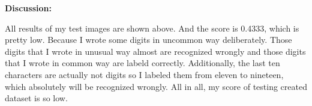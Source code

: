 \documentclass[11pt]{article}
\begin{document}
    \textbf{Discussion:}

All results of my test images are shown above. And the score is 0.4333,
which is pretty low. Because I wrote some digits in uncommon way
deliberately. Those digits that I wrote in unusual way almost are
recognized wrongly and those digits that I wrote in common way are
labeld correctly. Additionally, the last ten characters are actually not
digits so I labeled them from eleven to nineteen, which absolutely will
be recognized wrongly. All in all, my score of testing created dataset
is so low.


    
    
    
    
\end{document}
